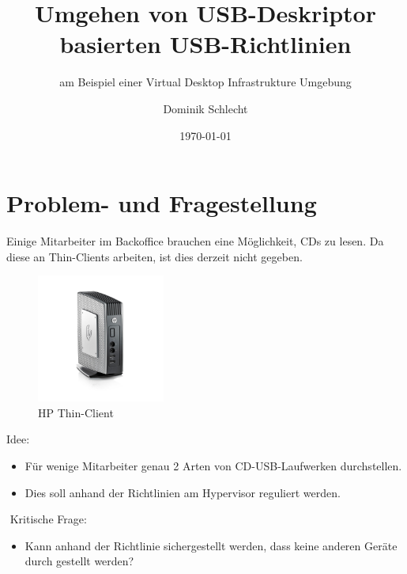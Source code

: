 \documentclass[]{beamer}
\title{Umgehen von USB-Deskriptor basierten USB-Richtlinien}
\subtitle{am Beispiel einer Virtual Desktop Infrastrukture Umgebung}
\date{\today}
\author{Dominik Schlecht}
\institute[THI]{Technische Hochschule Ingolstadt}
\begin{document}
	\frame{\maketitle}
	\frame{\tableofcontents}
	
	\section{Problem- und Fragestellung}
	\begin{frame}{\secname}
		Einige Mitarbeiter im Backoffice brauchen eine Möglichkeit, CDs zu lesen.	
		Da diese an Thin-Clients arbeiten, ist dies derzeit nicht gegeben.
		\begin{figure}[htbp]
			\centering
			\includegraphics[width=0.375\textwidth]{bilder/thinclient.jpg}
			\caption{HP Thin-Client}
			\label{fig:Thin-Client}
		\end{figure}
	\end{frame}
	
	\begin{frame}{\secname}
		Idee:
		\begin{itemize}
			\item Für wenige Mitarbeiter genau 2 Arten von CD-USB-Laufwerken durchstellen.
			\item Dies soll anhand der Richtlinien am Hypervisor reguliert werden.
		\end{itemize}
		\pause
		$ $\newline
		Kritische Frage:
		\begin{itemize}
			\item Kann anhand der Richtlinie sichergestellt werden, dass keine anderen Geräte durch gestellt werden?
		\end{itemize}
	\end{frame}
	
	\begin{frame}{\secname}
		
	\end{frame}
	
	\begin{frame}{\secname}
		\lstset{language=tikz}

		\begin{columns}[t,onlytextwidth]		
		
		
		
		
		\end{columns}
	\end{frame}
	
\end{document}
